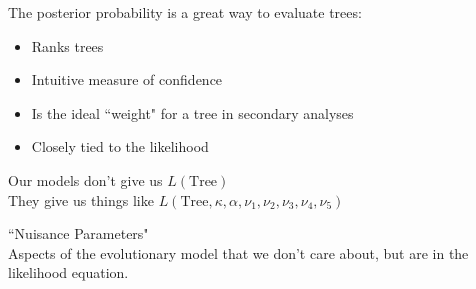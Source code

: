 \documentclass{seminar}
\begin{document}
\begin{slide}
\newslide
The posterior probability is a great way to evaluate trees:\\[15pt]
\begin{itemize}
	\item Ranks trees
	\item Intuitive measure of confidence
	\item Is the ideal ``weight" for a tree in secondary analyses
	\item Closely tied to the likelihood
\end{itemize}

\newslide
\large Our models don't give us $L(\mbox{Tree})$\\[10pt]
They give us things like $L(\mbox{Tree}, \kappa, \alpha, \nu_1, \nu_2, \nu_3, \nu_4, \nu_5)$\\[15pt]


\newslide
\Large
``Nuisance Parameters"\\[20pt]
Aspects of the evolutionary model that we don't care about, but are in the likelihood equation.
\newslide
{}
\newslide
{}



\end{slide}
\end{document}
